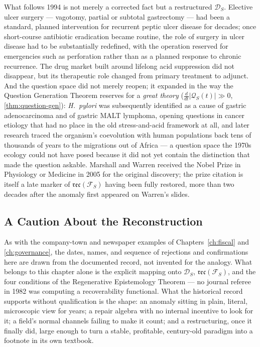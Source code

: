 \documentclass[12pt,twoside,openright]{book}
\newcommand{\reco}{\mathfrak{rec}}
\begin{document}
What follows 1994 is not merely a corrected fact but a
restructured $\mathcal{D}_S$. Elective ulcer surgery --- vagotomy,
partial or subtotal gastrectomy --- had been a standard, planned
intervention for recurrent peptic ulcer disease for decades; once
short-course antibiotic eradication became routine, the role of
surgery in ulcer disease had to be substantially redefined, with
the operation reserved for emergencies such as perforation rather
than as a planned response to chronic recurrence. The drug
market built around lifelong acid suppression did not disappear,
but its therapeutic role changed from primary treatment to
adjunct. And the question space did not merely reopen; it
expanded in the way the Question Generation Theorem reserves for
a \emph{great theory} ($\frac{d}{dt}|\mathcal{Q}_S(t)| \gg 0$,
\cref{thm:question-gen}): \emph{H.\ pylori} was subsequently
identified as a cause of gastric adenocarcinoma and of gastric
MALT lymphoma, opening questions in cancer etiology that had no
place in the old stress-and-acid framework at all, and later
research traced the organism's coevolution with human populations
back tens of thousands of years to the migrations out of Africa
--- a question space the 1970s ecology could not have posed because
it did not yet contain the distinction that made the question
askable. Marshall and Warren received the Nobel Prize in
Physiology or Medicine in 2005 for the original discovery; the
prize citation is itself a late marker of $\reco(\mathcal{F}_S)$
having been fully restored, more than two decades after the
anomaly first appeared on Warren's slides.

\subsection{A Caution About the Reconstruction}

As with the company-town and newspaper examples of
Chapters~\ref{ch:fiscal} and \ref{ch:governance}, the dates, names,
and sequence of rejections and confirmations here are drawn from
the documented record, not invented for the analogy. What belongs
to this chapter alone is the explicit mapping onto $\mathcal{D}_S$,
$\reco(\mathcal{F}_S)$, and the four conditions of the
Regenerative Epistemology Theorem --- no journal referee in 1982
was computing a recoverability functional. What the historical
record supports without qualification is the shape: an anomaly
sitting in plain, literal, microscopic view for years; a repair
algebra with no internal incentive to look for it; a field's
normal channels failing to make it count; and a restructuring,
once it finally did, large enough to turn a stable, profitable,
century-old paradigm into a footnote in its own textbook.
\end{document}

